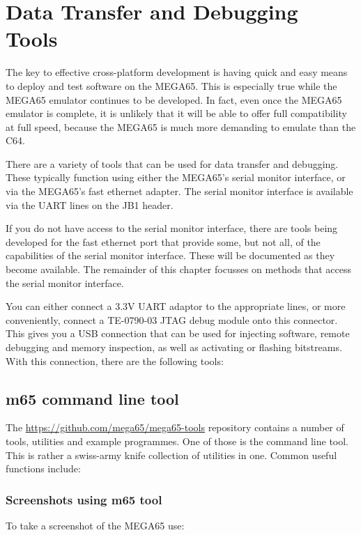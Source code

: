 \chapter{Data Transfer and Debugging Tools}

The key to effective cross-platform development is having quick and
easy means to deploy and test software on the MEGA65.  This is
especially true while the MEGA65 emulator continues to be developed.
In fact, even once the MEGA65 emulator is complete, it is unlikely
that it will be able to offer full compatibility at full speed,
because the MEGA65 is much more demanding to emulate than the C64.

There are a variety of tools that can be used for data transfer and
debugging.  These typically function using either the MEGA65's serial
monitor interface, or via the MEGA65's fast ethernet adapter.  The
serial monitor interface is available via the UART lines on the JB1
header.

If you do not have access to the serial monitor interface, there are
tools being developed for the fast ethernet port that provide some,
but not all, of the capabilities of the serial monitor
interface. These will be documented as they become available. The
remainder of this chapter focusses on methods that access the serial
monitor interface.

You can either connect a 3.3V UART adaptor to the appropriate
lines, or more conveniently, connect a TE-0790-03 JTAG debug module
onto this connector.  This gives you a USB connection that can be used
for injecting software, remote debugging and memory inspection, as
well as activating or flashing bitstreams.  With this connection,
there are the following tools:

\section{m65 command line tool}

The \url{https://github.com/mega65/mega65-tools} repository contains a
number of tools, utilities and example programmes.  One of those is
the  command line tool. This is rather a swiss-army
knife collection of utilities in one.  Common useful functions
include:

\subsection{Screenshots using m65 tool}

To take a screenshot of the MEGA65 use:

